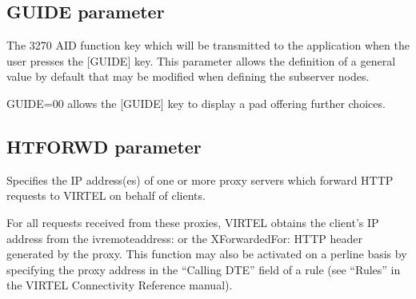 \documentclass[letterpaper,10pt,english]{sphinxmanual}
\begin{document}
\ignorespaces 

\subsection{GUIDE parameter}
\label{\detokenize{Installation_Guide:guide-parameter}}\label{\detokenize{Installation_Guide:index-75}}
\begin{sphinxVerbatim}[commandchars=\\\{\}]
                  
\end{sphinxVerbatim}

\sphinxAtStartPar
{} \sphinxhyphen{} The 3270 AID function key which will be transmitted to the application when the user presses the {[}GUIDE{]} key. This parameter allows the definition of a general value by default that may be modified when defining the subserver nodes.

\sphinxAtStartPar
GUIDE=00 allows the {[}GUIDE{]} key to display a pad offering further choices.

\ignorespaces 

\subsection{HTFORWD parameter}
\label{\detokenize{Installation_Guide:htforwd-parameter}}\label{\detokenize{Installation_Guide:index-76}}
\begin{sphinxVerbatim}[commandchars=\\\{\}]
        
\end{sphinxVerbatim}

\sphinxAtStartPar
{} \sphinxhyphen{} Specifies the IP address(es) of one or more proxy servers which forward HTTP requests to VIRTEL on behalf of clients.

\sphinxAtStartPar
For all requests received from these proxies, VIRTEL obtains the client’s IP address from the iv\sphinxhyphen{}remote\sphinxhyphen{}address: or the X\sphinxhyphen{}Forwarded\sphinxhyphen{}For: HTTP header generated by the proxy. This function may also be activated on a per\sphinxhyphen{}line basis by specifying the proxy address in the “Calling DTE” field of a rule (see “Rules” in the VIRTEL Connectivity Reference manual).
\end{document}
